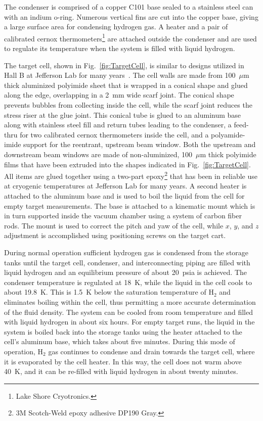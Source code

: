 The condenser is comprised of a copper C101 base
sealed to a stainless steel can with an indium o-ring.  Numerous vertical 
fins are cut into the copper base, giving a large surface area for condensing hydrogen gas.
A heater and a pair of calibrated cernox thermometers\footnote{Lake Shore Cryotronics.}
are attached outside the condenser and are used to regulate its temperature when the
system is filled with liquid hydrogen.

The target cell, shown in Fig.~\ref{fig:TargetCell}, is similar to
designs utilized in Hall B at Jefferson Lab for many years~\cite{HAKOBYAN2008218}.  
The cell walls are made from 100~$\mu$m thick aluminized
polyimide sheet that is wrapped in a conical shape and glued along the edge,
overlapping in a 2~mm wide scarf joint.  
The conical shape prevents bubbles from collecting inside the cell, while the
scarf joint reduces the stress riser at the glue joint.  This conical
tube is glued to an aluminum base 
along with stainless steel fill and return tubes leading to the condenser, a feed-thru for two
calibrated cernox thermometers inside the cell, and a
polyamide-imide support for the reentrant, upstream beam window.  
Both the upstream and downstream beam
windows are made of non-aluminized,
100~$\mu$m thick polyimide films that have been extruded into the
shapes indicated in Fig.~\ref{fig:TargetCell}. All items are glued together using
a two-part epoxy\footnote{3M Scotch-Weld epoxy adhesive DP190 Gray.}
that has been in reliable use at cryogenic temperatures at
Jefferson Lab for many years. 
A second  heater is attached to the aluminum base and
is used to boil the liquid from the cell for empty target measurements.
The base is attached to a kinematic mount which is in turn
supported inside the vacuum chamber using a system of carbon fiber rods.    
The mount is used to correct the pitch and yaw
of the cell, while $x$, $y$, and $z$ adjustment 
is accomplished using positioning screws on the target cart. 


During normal operation sufficient hydrogen gas is condensed from the storage tanks
until the target cell, condenser, and interconnecting piping are filled with liquid hydrogen
and an equilibrium pressure of about 20~psia is achieved.  
The condenser temperature is regulated at 18~K, while the
liquid in the cell cools to about 19.8~K.  This is 1.5~K below the saturation
temperature of H$_2$ and eliminates boiling within the cell, thus permitting a more
accurate determination of the fluid density.  
The system can be cooled from room temperature and filled with liquid hydrogen in
about six hours.
For empty target runs, the liquid in the system is boiled back into the storage tanks using the heater
attached to the cell's aluminum base, which takes about five minutes.  During this
mode of operation, H$_2$ gas continues to condense and drain towards the target cell, where it
is evaporated by the cell heater.  In this way, the cell does not warm above 40~K, and
it can be re-filled with liquid hydrogen in about twenty minutes.

